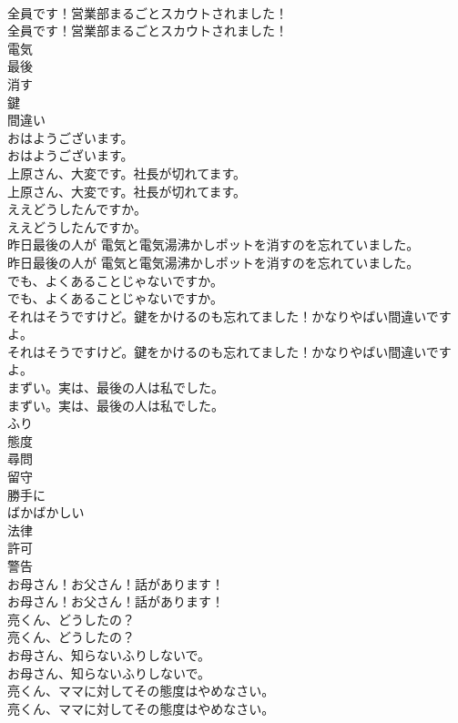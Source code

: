 \documentclass[8pt]{extreport}
\begin{document}
\begin{CJK}{UTF8}{min}
\\	全員です！営業部まるごとスカウトされました！	
\\	全員です！営業部まるごとスカウトされました！ 
\\	電気
\\	最後
\\	消す
\\	鍵
\\	間違い
\\	おはようございます。	
\\	おはようございます。 
\\	上原さん、大変です。社長が切れてます。	
\\	上原さん、大変です。社長が切れてます。 
\\	ええどうしたんですか。	
\\	ええどうしたんですか。 
\\	昨日最後の人が 電気と電気湯沸かしポットを消すのを忘れていました。	
\\	昨日最後の人が 電気と電気湯沸かしポットを消すのを忘れていました。 
\\	でも、よくあることじゃないですか。	
\\	でも、よくあることじゃないですか。 
\\	それはそうですけど。鍵をかけるのも忘れてました！かなりやばい間違いですよ。	
\\	それはそうですけど。鍵をかけるのも忘れてました！かなりやばい間違いですよ。 
\\	まずい。実は、最後の人は私でした。	
\\	まずい。実は、最後の人は私でした。 
\\	ふり
\\	態度
\\	尋問
\\	留守
\\	勝手に
\\	ばかばかしい
\\	法律
\\	許可
\\	警告
\\	お母さん！お父さん！話があります！	
\\	お母さん！お父さん！話があります！ 
\\	亮くん、どうしたの？	
\\	亮くん、どうしたの？ 
\\	お母さん、知らないふりしないで。	
\\	お母さん、知らないふりしないで。 
\\	亮くん、ママに対してその態度はやめなさい。	
\\	亮くん、ママに対してその態度はやめなさい。 

\end{CJK}
\end{document}
